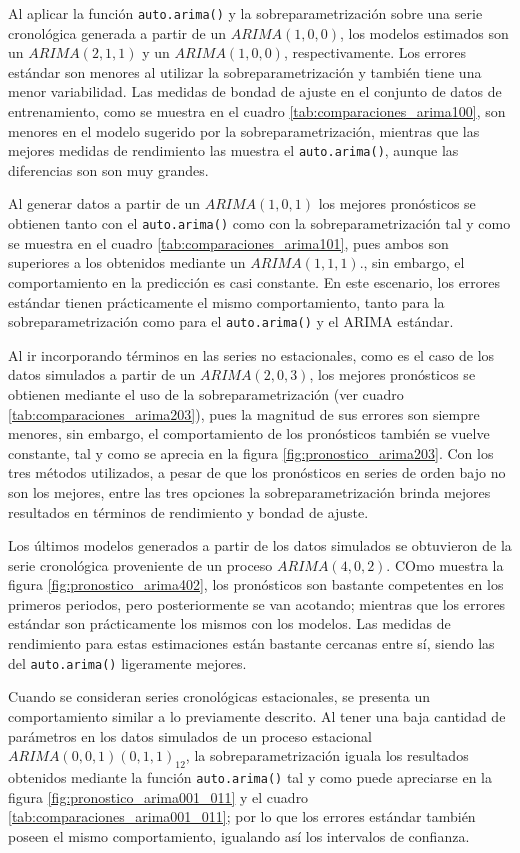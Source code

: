 \documentclass[
]{article}
\begin{document}
Al aplicar la función \texttt{auto.arima()} y la sobreparametrización
sobre una serie cronológica generada a partir de un \(ARIMA(1,0,0)\),
los modelos estimados son un \(ARIMA(2,1,1)\) y un \(ARIMA(1,0,0)\),
respectivamente. Los errores estándar son menores al utilizar la
sobreparametrización y también tiene una menor variabilidad. Las medidas
de bondad de ajuste en el conjunto de datos de entrenamiento, como se
muestra en el cuadro \ref{tab:comparaciones_arima100}, son menores en el
modelo sugerido por la sobreparametrización, mientras que las mejores
medidas de rendimiento las muestra el \texttt{auto.arima()}, aunque las
diferencias son son muy grandes.

Al generar datos a partir de un \(ARIMA(1,0,1)\) los mejores pronósticos
se obtienen tanto con el \texttt{auto.arima()} como con la
sobreparametrización tal y como se muestra en el cuadro
\ref{tab:comparaciones_arima101}, pues ambos son superiores a los
obtenidos mediante un \(ARIMA(1,1,1)\)., sin embargo, el comportamiento
en la predicción es casi constante. En este escenario, los errores
estándar tienen prácticamente el mismo comportamiento, tanto para la
sobreparametrización como para el \texttt{auto.arima()} y el ARIMA
estándar.

Al ir incorporando términos en las series no estacionales, como es el
caso de los datos simulados a partir de un \(ARIMA(2,0,3)\), los mejores
pronósticos se obtienen mediante el uso de la sobreparametrización (ver
cuadro \ref{tab:comparaciones_arima203}), pues la magnitud de sus
errores son siempre menores, sin embargo, el comportamiento de los
pronósticos también se vuelve constante, tal y como se aprecia en la
figura \ref{fig:pronostico_arima203}. Con los tres métodos utilizados, a
pesar de que los pronósticos en series de orden bajo no son los mejores,
entre las tres opciones la sobreparametrización brinda mejores
resultados en términos de rendimiento y bondad de ajuste.

Los últimos modelos generados a partir de los datos simulados se
obtuvieron de la serie cronológica proveniente de un proceso
\(ARIMA(4,0,2)\). COmo muestra la figura \ref{fig:pronostico_arima402},
los pronósticos son bastante competentes en los primeros periodos, pero
posteriormente se van acotando; mientras que los errores estándar son
prácticamente los mismos con los modelos. Las medidas de rendimiento
para estas estimaciones están bastante cercanas entre sí, siendo las del
\texttt{auto.arima()} ligeramente mejores.

Cuando se consideran series cronológicas estacionales, se presenta un
comportamiento similar a lo previamente descrito. Al tener una baja
cantidad de parámetros en los datos simulados de un proceso estacional
\(ARIMA(0,0,1)(0,1,1)_{12}\), la sobreparametrización iguala los
resultados obtenidos mediante la función \texttt{auto.arima()} tal y
como puede apreciarse en la figura \ref{fig:pronostico_arima001_011} y
el cuadro \ref{tab:comparaciones_arima001_011}; por lo que los errores
estándar también poseen el mismo comportamiento, igualando así los
intervalos de confianza.
\end{document}
